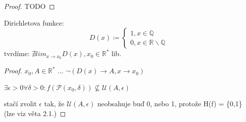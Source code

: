 \begin{proof}
  TODO
\end{proof}

\begin{priklad}
  Dirichletova funkce:
  $$D(x) \coloneq \begin{cases} 1, x \in \mathbb Q \\ 0, x \in \mathbb R \smallsetminus \mathbb Q \end{cases}$$
  tvrdíme: $\nexists lim_{x \to x_0}{D(x)}, x_0 \in \mathbb R^*$ lib.
\end{priklad}

\begin{proof}
  $x_0, A \in \mathbb R^*$ ... $\neg (D(x) \rightarrow A, x \rightarrow x_0)$

  $\exists \epsilon > 0 \forall \delta > 0: f(\mathscr P(x_0, \delta)) \nsubseteq \mathscr U(A, \epsilon)$

  stačí zvolit $\epsilon$ tak, že $\mathscr U(A, \epsilon)$ neobsahuje buď 0, nebo 1, protože H(f) = \{0,1\} (lze viz věta 2.1.)
\end{proof}
